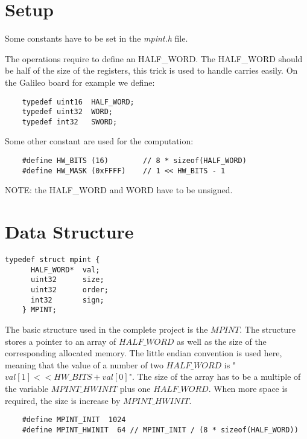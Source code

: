 \documentclass[10pt,a4paper]{article}
\begin{document}
  \section{Setup}
  
  Some constants have to be set in the \textit{mpint.h} file.
  
  The operations require to define an HALF\_WORD. The HALF\_WORD should be half of the size of the registers, this trick is used to handle carries
  easily. On the Galileo board for example we define:
  
  \begin{lstlisting}
    typedef uint16  HALF_WORD;
    typedef uint32  WORD;
    typedef int32   SWORD;
  \end{lstlisting}
  
  Some other constant are used for the computation:
  \begin{lstlisting}
    #define HW_BITS (16)        // 8 * sizeof(HALF_WORD)
    #define HW_MASK (0xFFFF)	// 1 << HW_BITS - 1
  \end{lstlisting}
  
  NOTE: the HALF\_WORD and WORD have to be unsigned.
  
  \section{Data Structure}
  
  \begin{lstlisting}[caption= MPINT structure, label = mpint]
    typedef struct mpint {
      HALF_WORD*  val;
      uint32      size;
      uint32      order;
      int32       sign;
    } MPINT;
  \end{lstlisting}
  
  The basic structure used in the complete project is the $MPINT$. The structure stores a pointer to an array of $HALF\_WORD$ as well as the size of the corresponding
  allocated memory. The little endian convention is used here, meaning that the value of a number of two $HALF\_WORD$ is "$val[1] << HW\_BITS + val[0]$".
  The size of the array has to be a multiple of the variable $MPINT\_HWINIT$ plus one $HALF\_WORD$. When more space is required, the size is increase by
  $MPINT\_HWINIT$.
  
  \begin{lstlisting}
    #define MPINT_INIT  1024
    #define MPINT_HWINIT  64 // MPINT_INIT / (8 * sizeof(HALF_WORD))
  \end{lstlisting}
  
\end{document}
